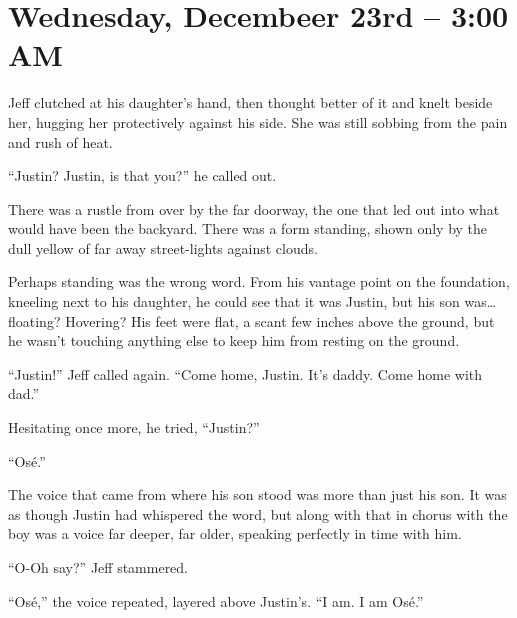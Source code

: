 \chapter{Wednesday, Decembeer 23rd -- 3:00 AM}

Jeff clutched at his daughter's hand, then thought better of it and knelt beside her, hugging her protectively against his side.  She was still sobbing from the pain and rush of heat.

``Justin?  Justin, is that you?'' he called out.

There was a rustle from over by the far doorway, the one that led out into what would have been the backyard.  There was a form standing, shown only by the dull yellow of far away street-lights against clouds.

Perhaps standing was the wrong word.  From his vantage point on the foundation, kneeling next to his daughter, he could see that it was Justin, but his son was\ldots{}floating?  Hovering? His feet were flat, a scant few inches above the ground, but he wasn't touching anything else to keep him from resting on the ground.

``Justin!'' Jeff called again.  ``Come home, Justin.  It's daddy.  Come home with dad.''

Hesitating once more, he tried, ``Justin?''

``Os\'e.''

The voice that came from where his son stood was more than just his son.  It was as though Justin had whispered the word, but along with that in chorus with the boy was a voice far deeper, far older, speaking perfectly in time with him.

``O-Oh say?'' Jeff stammered.

``Os\'e,'' the voice repeated, layered above Justin's.  ``I am.  I am Os\'e.''

\secdiv

\secdiv
